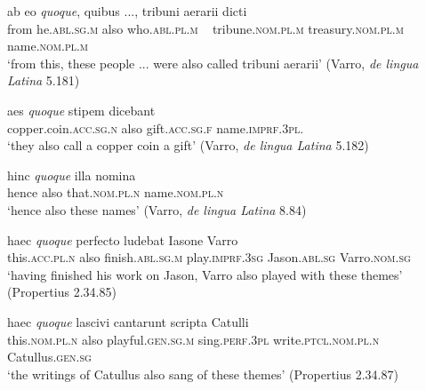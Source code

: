 \begin{exe}
\ex
\gll ab eo \emph{quoque}, quibus ..., tribuni aerarii dicti\\
from he.\textsc{abl.sg.m} also who.\textsc{abl.pl.m} ~ tribune.\textsc{nom.pl.m} treasury.\textsc{nom.pl.m} name.\textsc{nom.pl.m}\\
\trans `from this, these people ... were also called tribuni aerarii' (Varro, \textit{de lingua Latina} 5.181)
\label{quoque3}
\end{exe}

\begin{exe}
\ex
\gll aes \emph{quoque} stipem dicebant\\
copper.coin.\textsc{acc.sg.n} also gift.\textsc{acc.sg.f} name.\textsc{imprf.3pl.}\\
\trans `they also call a copper coin a gift' (Varro, \textit{de lingua Latina} 5.182)
\label{quoque4}
\end{exe}

\begin{exe}
\ex
\gll hinc \emph{quoque} illa nomina\\
hence also that.\textsc{nom.pl.n} name.\textsc{nom.pl.n}\\
\trans `hence also these names' (Varro, \textit{de lingua Latina} 8.84)
\label{quoque5}
\end{exe}

\begin{exe}
\ex
\gll haec \emph{quoque} perfecto ludebat Iasone Varro\\
this.\textsc{acc.pl.n} also finish.\textsc{abl.sg.m} play.\textsc{imprf.3sg} Jason.\textsc{abl.sg} Varro.\textsc{nom.sg}\\
\trans `having finished his work on Jason, Varro also played with these themes' (Propertius 2.34.85)
\label{quoque6}
\end{exe}

\begin{exe}
\ex
\gll haec \emph{quoque} lascivi cantarunt scripta Catulli\\
this.\textsc{nom.pl.n} also playful.\textsc{gen.sg.m} sing.\textsc{perf.3pl} write.\textsc{ptcl.nom.pl.n} Catullus.\textsc{gen.sg}\\
\trans `the writings of Catullus also sang of these themes' (Propertius 2.34.87)
\label{quoque7}
\end{exe}


